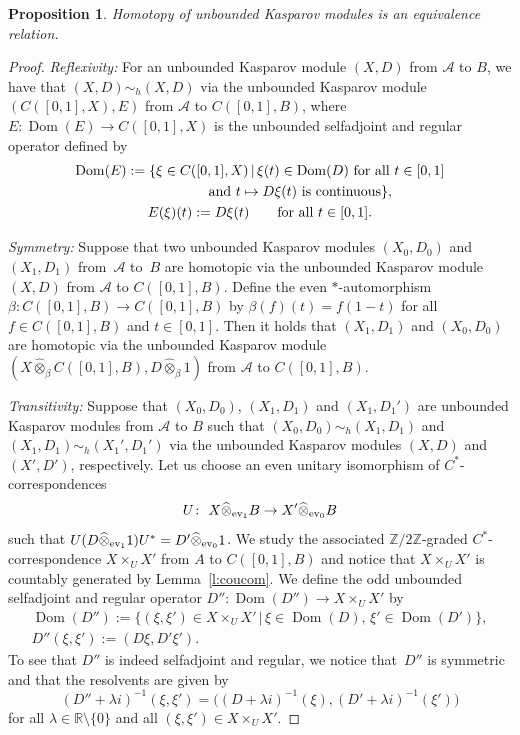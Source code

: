 \documentclass[pdftex]{sigma}
\numberwithin{equation}{section}
\newtheorem{prop}[Theorem]{Proposition}
 { \theoremstyle{definition}
\newtheorem{dfn}[Theorem]{Definition}
\newtheorem{exa}[Theorem]{Example}
\newtheorem{rem}[Theorem]{Remark} }
\newcommand{\hot}{\widehat \otimes}
\newcommand{\ti}{\times}
\newcommand{\zz}{\mathbb{Z}}
\newcommand{\rr}{\mathbb{R}}
\newcommand{\be}{\beta}
\newcommand{\la}{\lambda}
\newcommand{\s}[1]{\mathscr{#1}}
\begin{document}
\begin{prop}\label{p:unbhom}
Homotopy of unbounded Kasparov modules is an equivalence relation.
\end{prop}
\begin{proof}{\it Reflexivity:} For an unbounded Kasparov module $(X,D)$ from $\s A$ to $B$, we have that $(X,D) \sim_h (X,D)$ via the unbounded Kasparov module $( C([0,1],X), E)$ from $\s A$ to $C([0,1],B)$, where $E\colon \operatorname{Dom}(E) \to C( [0,1],X)$ is the unbounded selfadjoint and regular operator defined by
\begin{gather*}
\operatorname{Dom}(E) := \{ \xi \in C( [0,1],X) \,|\, \xi(t) \in \operatorname{Dom}(D) \ \text{for all} \ t \in [0,1] \\
\hphantom{\operatorname{Dom}(E) := \{}{} \text{and} \ t \mapsto D \xi(t) \ \text{is continuous} \}, \\
E(\xi)(t) := D \xi(t) \qquad \text{for all } t \in [0,1] .
\end{gather*}

{\it Symmetry:} Suppose that two unbounded Kasparov modules $(X_0,D_0)$ and $(X_1,D_1)$ from~$\s A$ to~$B$ are homotopic via the unbounded Kasparov module $(X,D)$ from $\s A$ to $C( [0,1],B)$. Define the even $*$-automorphism $\be\colon C( [0,1],B) \to C( [0,1] , B)$ by $\be(f)(t) = f(1 - t)$ for all $f \in C( [0,1],B)$ and $t \in [0,1]$. Then it holds that $(X_1,D_1)$ and $(X_0,D_0)$ are homotopic via the unbounded Kasparov module $(X \hot_{\be} C( [0,1],B), D \hot_{\be} 1)$ from $\s A$ to $C([0,1],B)$.

{\it Transitivity:} Suppose that $(X_0,D_0)$, $(X_1,D_1)$ and $(X_1,D_1')$ are unbounded Kasparov modules from $\s A$ to $B$ such that $(X_0,D_0) \sim_h (X_1,D_1)$ and $(X_1,D_1) \sim_h (X_1',D_1')$ via the unbounded Kasparov modules $(X,D)$ and $(X', D')$, respectively. Let us choose an even unitary isomorphism of $C^*$-correspondences
\[
U\colon \ X \hot_{{\rm ev}_1} B \to X' \hot_{{\rm ev}_0} B
\]
such that $U (D \hot_{{\rm ev}_1} 1) U^* = D' \hot_{{\rm ev}_0} 1$. We study the associated $\zz/2\zz$-graded $C^*$-correspondence $X \ti_U X'$ from $A$ to $C([0,1],B)$ and notice that $X \ti_U X'$ is countably generated by Lemma~\ref{l:coucom}. We define the odd unbounded selfadjoint and regular operator $D''\colon \operatorname{Dom}(D'') \to X \ti_U X'$ by
\begin{gather*}
\operatorname{Dom}(D'') := \{ (\xi,\xi') \in X \ti_U X' \,|\, \xi \in \operatorname{Dom}(D) , \, \xi' \in \operatorname{Dom}(D') \}, \\
D''(\xi,\xi') := (D \xi, D' \xi') .
\end{gather*}
To see that $D''$ is indeed selfadjoint and regular, we notice that~$D''$ is symmetric and that the resolvents are given by
\[
(D'' + \la i )^{-1} (\xi,\xi') = \big( (D + \la i )^{-1}(\xi), (D' + \la i )^{-1}(\xi')\big)
\]
for all $\la \in \rr \setminus \{0\}$ and all $(\xi,\xi') \in X \ti_U X'$.


\end{proof}
\end{document}
